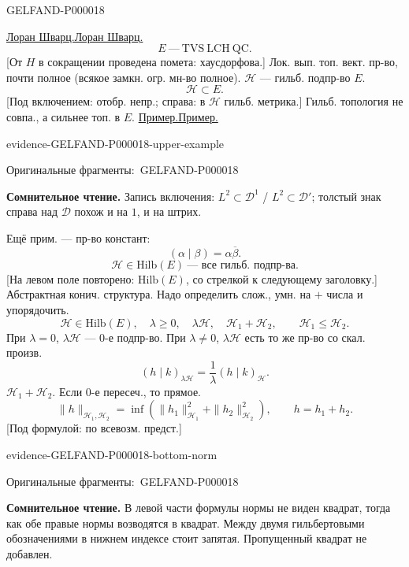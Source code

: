 \documentclass[11pt]{article}
\let\MathUnderline\underline
\renewcommand{\underline}[1]{\ifmmode\MathUnderline{#1}\else\uline{#1}\fi}
\newcommand{\SourcePage}[2]{\par\smallskip\phantomsection\label{#1:source-page}{\small\sffamily\color{blue!55!black}#1}\par\smallskip}
\newcommand{\EvidenceBlock}[4]{%
 \par\smallskip\noindent\begin{minipage}{\linewidth}
 \begin{minipage}[t]{.47\linewidth}\vspace{0pt}\centering
 \csname evidence-#1-#2\endcsname\par
 {\scriptsize\SourceCropCaption\ #1}\par
 \end{minipage}\hfill
 \begin{minipage}[t]{.49\linewidth}\vspace{0pt}\raggedright
 {\small\color{orange!65!black}\textbf{#4} #3}\par
 \end{minipage}
 \end{minipage}\par\smallskip}
\newcommand{\Unclear}[3]{\EvidenceBlock{#1}{#2}{#3}{\ReadingCaption}}
\newcommand{\SourceCropCaption}{Оригинальные фрагменты:}\newcommand{\ReadingCaption}{Сомнительное чтение.}\newcommand{\IncompleteCaption}{Неразобранный фрагмент.}\newcommand{\DiagramCaption}{Рисунок и набранное описание.}
\begin{document}
\SourcePage{GELFAND-P000018}{unlabelled}
\underline{Лоран Шварц.}
\begin{equation*}
E\ \text{---}\ \mathrm{TVS\ LCH\ QC}.
\end{equation*}
[От $H$ в сокращении проведена помета: хаусдорфова.]
Лок. вып. топ. вект. пр-во, почти полное (всякое замкн. огр. мн-во полное).
$\mathcal H$ --- гильб. подпр-во $E$.
\begin{equation*}
\mathcal H\subset E.
\end{equation*}
[Под включением: отобр. непр.; справа: в $\mathcal H$ гильб. метрика.]
Гильб. топология не совпа., а сильнее топ. в $E$.
\underline{Пример.}
\Unclear{GELFAND-P000018}{upper-example}{Запись включения: $L^2\subset\mathcal D^1$ / $L^2\subset\mathcal D'$; толстый знак справа над $\mathcal D$ похож и на $1$, и на штрих.}
Ещё прим. --- пр-во констант:
\begin{equation*}
(\alpha\mid\beta)=\alpha\overline\beta.
\end{equation*}
\begin{equation*}
\mathcal H\in\mathrm{Hilb}(E)\ \text{--- все гильб. подпр-ва}.
\end{equation*}
[На левом поле повторено: $\mathrm{Hilb}(E)$, со стрелкой к следующему заголовку.]
Абстрактная конич. структура.
Надо определить слож., умн. на $+$ числа и упорядочить.
\begin{equation*}
\mathcal H\in\mathrm{Hilb}(E),\quad \lambda\geq0,\quad \lambda\mathcal H,\quad
\mathcal H_1+\mathcal H_2,\qquad \mathcal H_1\leq\mathcal H_2.
\end{equation*}
При $\lambda=0$, $\lambda\mathcal H$ --- 0-е подпр-во.
При $\lambda\ne0$, $\lambda\mathcal H$ есть то же пр-во со скал. произв.
\begin{equation*}
(h\mid k)_{\lambda\mathcal H}=\frac1\lambda(h\mid k)_{\mathcal H}.
\end{equation*}
$\mathcal H_1+\mathcal H_2$.
Если 0-е пересеч., то прямое.
\begin{equation*}
\|h\|_{\mathcal H_1,\mathcal H_2}
=\inf\left(\|h_1\|_{\mathcal H_1}^2+\|h_2\|_{\mathcal H_2}^2\right),\qquad h=h_1+h_2.
\end{equation*}
[Под формулой: по всевозм. предст.]
\Unclear{GELFAND-P000018}{bottom-norm}{В левой части формулы нормы не виден квадрат, тогда как обе правые нормы возводятся в квадрат. Между двумя гильбертовыми обозначениями в нижнем индексе стоит запятая. Пропущенный квадрат не добавлен.}
\end{document}
